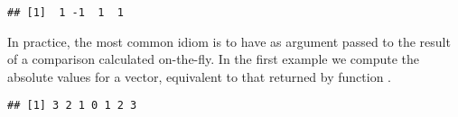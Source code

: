 \documentclass[krantz2]{krantz}\usepackage{knitr}%
\begin{document}
\begin{knitrout}\footnotesize
{}\color{fgcolor}\begin{kframe}
\begin{alltt}
 \hlkwb{<-} \hlstd{(}\hlstd{,} \hlstd{,} \hlstd{,} \hlstd{)}
\hlstd{(}   \hlstd{=} \hlstd{,}  \hlstd{=} \hlopt{-}\hlstd{)}
\end{alltt}
\begin{verbatim}
## [1]  1 -1  1  1
\end{verbatim}
\end{kframe}
\end{knitrout}

In practice, the most common idiom is to have as argument passed to  the result of a comparison calculated on-the-fly. In the first example we compute the absolute values for a vector, equivalent to that returned by \Rlang function .

\begin{knitrout}\footnotesize
{}\color{fgcolor}\begin{kframe}
\begin{alltt}
 \hlkwb{<-} \hlopt{-}\hlopt{:+}
 \hlopt{<} \hlstd{,} \hlopt{-}
\end{alltt}
\begin{verbatim}
## [1] 3 2 1 0 1 2 3
\end{verbatim}
\end{kframe}
\end{knitrout}
\end{document}
